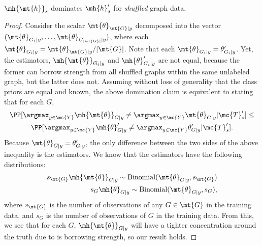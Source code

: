 \documentclass[10pt,journal,cspaper,compsoc]{IEEEtran}
\begin{document}
\begin{thm} \label{thm:tdomp}
	$\mh{\mt{h}}_s$ dominates $\mh{h}_s'$ for \emph{shuffled} graph data. 	
\end{thm}
\begin{proof}
Consider the scalar $\mt{\theta}_{\mt{G}|y}$ decomposed into the vector $(\mt{\theta}_{G_1|y},\ldots,\mt{\theta}_{G_{|\mt{G}|}|y})$, where each $\mt{\theta}_{G_i|y}=\mt{\theta}_{\mt{G}|y}/|\mt{G}|$. Note that each $\mt{\theta}_{G_i|y} = \theta'_{G_i|y}$.  Yet, the estimators, $\mh{\mt{\theta}}_{G_i|y}$ and $\mh{\theta}'_{G_i|y}$ are not equal, because the former can borrow strength from all shuffled graphs within the same unlabeled graph, but the latter does not.  Assuming without loss of generality that the class priors are equal and known, the above domination claim is equivalent to stating that for each $G$,
\begin{multline}
	\PP[\argmax_{y \in \mc{Y}} \mh{\mt{\theta}}_{G|y} \neq \argmax_{y \in \mc{Y}} \mt{\theta}_{G|y} | \mc{T}_s'] \leq \\ \PP[\argmax_{y \in \mc{Y}} \mh{\theta}'_{G|y}  \neq \argmax_{y \in \mc{Y}} \theta'_{G|y} | \mc{T}_s'].
\end{multline}
Because $\mt{\theta}_{G|y}=\theta'_{G|y}$, the only difference between the two sides of the above inequality is the estimators.  We know that the estimators have the following distributions:
\begin{subequations}
\begin{align}
	s_{\mt{G}} \mh{\mt{\theta}}_{G|y} \sim \text{Binomial}(\mt{\theta}_{G|y}, s_{\mt{G}}) \\
	s_G \mh{\theta}_{G|y} \sim \text{Binomial}(\mt{\theta}_{G|y}, s_{G}),
\end{align}
\end{subequations}
where $s_{\mt{G}}$ is the number of observations of any $G \in \mt{G}$ in the training data, and $s_G$ is the number of observations of $G$ in the training data.  From this, we see that for each $G$, $\mh{\mt{\theta}}_{G|y}$ will have a tighter concentration around the truth due to is borrowing strength, so our result holds. 
\end{proof}

\end{document}
